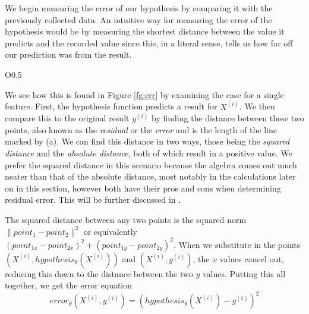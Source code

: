 We begin measuring the error of our hypothesis by comparing it with the
previously collected data.  An intuitive way for measuring the  error of the
hypothesis would be by measuring the shortest distance between the value it
predicts and the recorded value since this, in a literal sense, tells us how far
off our prediction was from the result.

\begin{wrapfigure}{O}{0.5\textwidth}
    \centering
    \caption{Visual representation of the distance between expected and actual
    results.}
    \label{fg:err}
\end{wrapfigure}

We see how this is found in Figure \ref{fg:err} by examining the case for
a single feature. First, the hypothesis function predicts a result for $X^{(i)}$. We
then compare this to the original result $y^{(i)}$ by finding the distance
between these two points, also known as the \emph{residual} or the \emph{error}
and is the length of the line marked by (a). We can find this distance in two ways, those being the \emph{squared distance} and the \emph{absolute distance}, both of which result in a positive value.
We prefer the squared distance in this scenario because the algebra comes out much neater than that of the absolute distance, most notably in the calculations later on in this section, however both have their pros and cons when determining residual error. This will be further discussed in \placeholder.

The squared distance between any two points
is the squared norm $\| point_1 - point_2 \|^2$ or
equivalently $(point_{1x}-point_{2x})^2 + (point_{1y}-point_{2y})^2$. When we
substitute in the points $(X^{(i)}, hypothesis_{\theta}(X^{(i)}))$ and $(X^{(i)}, y^{(i)})$, the $x$ values cancel out, reducing this down to the distance between the two $y$ values. Putting this all
together, we get the error equation
\begin{equation}
    error_{\theta}(X^{(i)}, y^{(i)}) = (hypothesis_{\theta}(X^{(i)}) - y^{(i)})^2
\end{equation}

